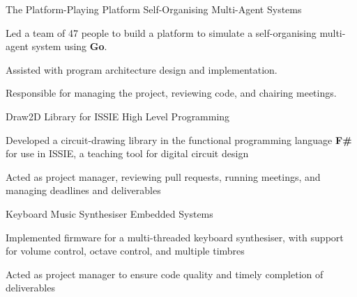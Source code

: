 

\begin{cvprojects}


  \cvproject
  {The Platform-Playing Platform} %
  {Self-Organising Multi-Agent Systems} %
  { %
      \begin{cvitems}
          \item Led a team of 47 people to build a platform to simulate a self-organising multi-agent system using \textbf{Go}.
          \item Assisted with program architecture design and implementation.
          \item Responsible for managing the project, reviewing code, and chairing meetings.
      \end{cvitems}
  }

  \cvproject
  {Draw2D Library for ISSIE} %
  {High Level Programming} %
  { %
      \begin{cvitems}
          \item {Developed a circuit-drawing library in the functional programming language \textbf{F\#} for use in ISSIE, a teaching tool for digital circuit design}%
          \item Acted as project manager, reviewing pull requests, running meetings, and managing deadlines and deliverables
      \end{cvitems}
  }

  \cvproject
  {Keyboard Music Synthesiser} %
  {Embedded Systems} %
  { %
      \begin{cvitems}
          \item {Implemented firmware for a multi-threaded keyboard synthesiser, with support for volume control, octave control, and multiple timbres}
          \item Acted as project manager to ensure code quality and timely completion of deliverables
      \end{cvitems}
  }


\end{cvprojects}
